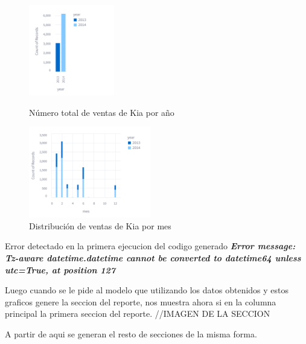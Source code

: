 \begin{figure}[H] %
	\centering %
	\begin{minipage}{0.48\textwidth} %
		\centering
		\includegraphics[height=150px]{grafica_anual.png} %
		\caption{Número total de ventas de Kia por año}
		\label{fig:ejemplo_introduccion_grafico_anual}
	\end{minipage}
	\begin{minipage}{0.48\textwidth} %
		\centering
		\includegraphics[height=150px]{grafica_mensual.png} %
		\caption{Distribución de ventas de Kia por mes}
		\label{fig:ejemplo_introduccion_grafico_mensual}
	\end{minipage}
\end{figure}

Error detectado en la primera ejecucion del codigo generado
\textbf{\textit{Error message: Tz-aware datetime.datetime cannot be converted to datetime64 unless utc=True, at position 127}}

Luego cuando se le pide al modelo que utilizando los datos obtenidos y estos graficos genere la seccion del reporte, nos muestra ahora si en la columna principal la primera seccion del reporte.
//IMAGEN DE LA SECCION

A partir de aqui se generan el resto de secciones de la misma forma.